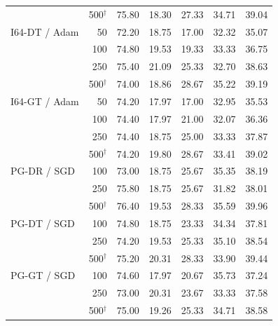 \begin{table}[p]
\begin{tabular}{lrrrrrr}
 & 500$^{\dagger}$ & 75.80 & 18.30 & 27.33 & 34.71 & 39.04 \\
\addlinespace[2pt]
I64-DT / Adam & 50 & 72.20 & 18.75 & 17.00 & 32.32 & 35.07 \\
 & 100 & 74.80 & 19.53 & 19.33 & 33.33 & 36.75 \\
 & 250 & 75.40 & 21.09 & 25.33 & 32.70 & 38.63 \\
 & 500$^{\dagger}$ & 74.00 & 18.86 & 28.67 & 35.22 & 39.19 \\
\addlinespace[2pt]
I64-GT / Adam & 50 & 74.20 & 17.97 & 17.00 & 32.95 & 35.53 \\
 & 100 & 74.40 & 17.97 & 21.00 & 32.07 & 36.36 \\
 & 250 & 74.40 & 18.75 & 25.00 & 33.33 & 37.87 \\
 & 500$^{\dagger}$ & 74.20 & 19.80 & 28.67 & 33.41 & 39.02 \\
\addlinespace[2pt]
PG-DR / SGD & 100 & 73.00 & 18.75 & 25.67 & 35.35 & 38.19 \\
 & 250 & 75.80 & 18.75 & 25.67 & 31.82 & 38.01 \\
 & 500$^{\dagger}$ & 76.40 & 19.53 & 28.33 & 35.59 & 39.96 \\
\addlinespace[2pt]
PG-DT / SGD & 100 & 74.80 & 18.75 & 23.33 & 34.34 & 37.81 \\
 & 250 & 74.20 & 19.53 & 25.33 & 35.10 & 38.54 \\
 & 500$^{\dagger}$ & 75.20 & 20.31 & 28.33 & 33.90 & 39.44 \\
\addlinespace[2pt]
PG-GT / SGD & 100 & 74.60 & 17.97 & 20.67 & 35.73 & 37.24 \\
 & 250 & 73.00 & 20.31 & 23.67 & 33.33 & 37.58 \\
 & 500$^{\dagger}$ & 75.00 & 19.26 & 25.33 & 34.71 & 38.58 \\
\bottomrule
\end{tabular}
\endgroup
\end{table}

